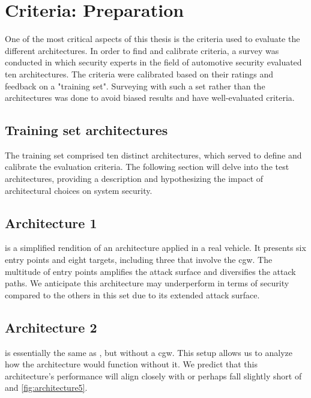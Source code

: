 \chapter{Criteria: Preparation}
\label{chp:introcriteria}

One of the most critical aspects of this thesis is the criteria used to evaluate the different architectures.
In order to find and calibrate criteria, a survey was conducted in which security experts in the field of automotive security evaluated ten architectures.
The criteria were calibrated based on their ratings and feedback on a "training set".
Surveying with such a set rather than the architectures was done to avoid biased results and have well-evaluated criteria.

\section{Training set architectures}
\label{sec:trainingarch}

The training set comprised ten distinct architectures, which served to define and calibrate the evaluation criteria. 
The following section will delve into the test architectures, 
providing a description and hypothesizing the impact of architectural choices on system security.

\section{Architecture 1}
\label{subsec:arch1}

 is a simplified rendition of an architecture applied in a real vehicle. 
It presents six entry points and eight targets, including three that involve the \acrshort{cgw}. 
The multitude of entry points amplifies the attack surface and diversifies the attack paths. 
We anticipate this architecture may underperform in terms of security compared to the others in this set due to its extended attack surface.

\section{Architecture 2}
\label{subsec:arch2}

 is essentially the same as , 
but without a \acrshort{cgw}.
This setup allows us to analyze how the architecture would function without it. 
We predict that this architecture's performance will align closely with or perhaps 
fall slightly short of  and \ref{fig:architecture5}.


